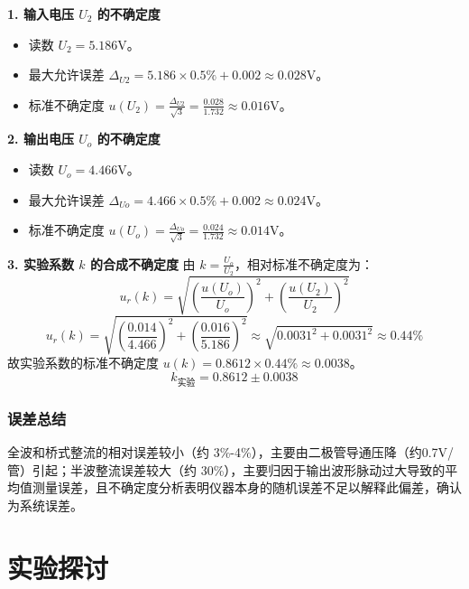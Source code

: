 \documentclass[]{../template/Report}%
\begin{document}
\begin{fullreportonly}
\textbf{1. 输入电压 $U_2$ 的不确定度}
\begin{itemize}
    \item 读数 $U_2 = 5.186\text{V}$。
    \item 最大允许误差 $\Delta_{U2} = 5.186 \times 0.5\% + 0.002 \approx 0.028\text{V}$。
    \item 标准不确定度 $u(U_2) = \frac{\Delta_{U2}}{\sqrt{3}} = \frac{0.028}{1.732} \approx 0.016\text{V}$。
\end{itemize}

\textbf{2. 输出电压 $U_o$ 的不确定度}
\begin{itemize}
    \item 读数 $U_o = 4.466\text{V}$。
    \item 最大允许误差 $\Delta_{Uo} = 4.466 \times 0.5\% + 0.002 \approx 0.024\text{V}$。
    \item 标准不确定度 $u(U_o) = \frac{\Delta_{Uo}}{\sqrt{3}} = \frac{0.024}{1.732} \approx 0.014\text{V}$。
\end{itemize}

\textbf{3. 实验系数 $k$ 的合成不确定度}
由 $k = \frac{U_o}{U_2}$，相对标准不确定度为：
$$ u_r(k) = \sqrt{\left(\frac{u(U_o)}{U_o}\right)^2 + \left(\frac{u(U_2)}{U_2}\right)^2} $$
$$ u_r(k) = \sqrt{\left(\frac{0.014}{4.466}\right)^2 + \left(\frac{0.016}{5.186}\right)^2} \approx \sqrt{0.0031^2 + 0.0031^2} \approx 0.44\% $$
故实验系数的标准不确定度 $u(k) = 0.8612 \times 0.44\% \approx 0.0038$。
$$ k_{\text{实验}} = 0.8612 \pm 0.0038 $$

\subsubsection{误差总结}
全波和桥式整流的相对误差较小（约 3\%-4\%），主要由二极管导通压降（约0.7V/管）引起；半波整流误差较大（约 30\%），主要归因于输出波形脉动过大导致的平均值测量误差，且不确定度分析表明仪器本身的随机误差不足以解释此偏差，确认为系统误差。


\section{实验探讨}


\end{fullreportonly}
\end{document}
